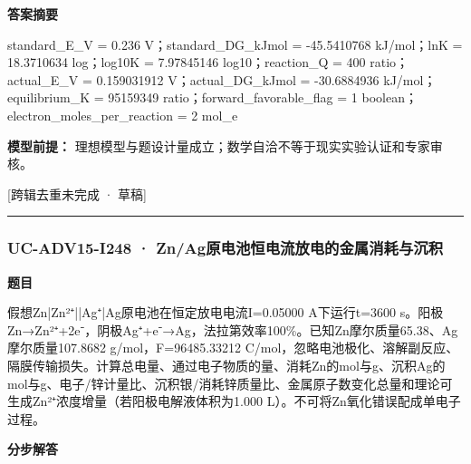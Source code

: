 \documentclass[UTF8,11pt,a4paper]{ctexart}
\begin{document}
\noindent\textbf{答案摘要}\par
standard\_E\_V = 0.236 V；standard\_DG\_kJmol = -45.5410768 kJ/mol；lnK = 18.3710634 log；log10K = 7.97845146 log10；reaction\_Q = 400 ratio；actual\_E\_V = 0.159031912 V；actual\_DG\_kJmol = -30.6884936 kJ/mol；equilibrium\_K = 95159349 ratio；forward\_favorable\_flag = 1 boolean；electron\_moles\_per\_reaction = 2 mol\_e\par
\noindent\textbf{模型前提：}
理想模型与题设计量成立；数学自洽不等于现实实验认证和专家审核。\par
\noindent\textcolor{red!65!black}{[跨辑去重未完成 · 草稿]} \par
\medskip\hrule\medskip
{}
\subsubsection*{UC-ADV15-I248 · Zn/Ag原电池恒电流放电的金属消耗与沉积}
\noindent\textbf{题目}\par
假想Zn|Zn²⁺||Ag⁺|Ag原电池在恒定放电电流I=0.05000 A下运行t=3600 s。阳极Zn→Zn²⁺+2e⁻，阴极Ag⁺+e⁻→Ag，法拉第效率100\%。已知Zn摩尔质量65.38、Ag摩尔质量107.8682 g/mol，F=96485.33212 C/mol，忽略电池极化、溶解副反应、隔膜传输损失。计算总电量、通过电子物质的量、消耗Zn的mol与g、沉积Ag的mol与g、电子/锌计量比、沉积银/消耗锌质量比、金属原子数变化总量和理论可生成Zn²⁺浓度增量（若阳极电解液体积为1.000 L）。不可将Zn氧化错误配成单电子过程。\par
\medskip\noindent\textbf{分步解答}
\end{document}

